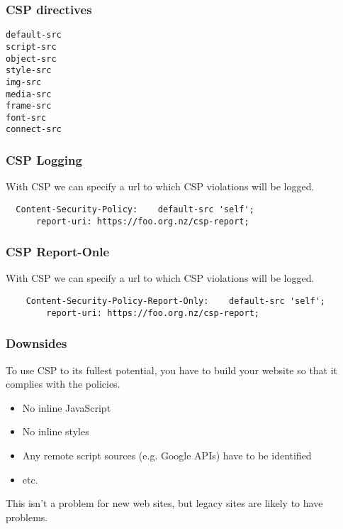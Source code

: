 \documentclass[10pt]{beamer}
\begin{document}
\begin{frame}[fragile]
\frametitle{CSP directives}

\begin{verbatim}
default-src
script-src
object-src
style-src
img-src
media-src
frame-src
font-src
connect-src
\end{verbatim}




\end{frame}

\begin{frame}[fragile]
\frametitle{CSP Logging}

With CSP we can specify a url to which CSP violations will be logged. 

\begin{verbatim}
  Content-Security-Policy:    default-src 'self'; 
      report-uri: https://foo.org.nz/csp-report;
\end{verbatim}


\end{frame}

\begin{frame}[fragile]
	\frametitle{CSP Report-Onle}
	
	With CSP we can specify a url to which CSP violations will be logged. 
	
	\begin{verbatim}
	Content-Security-Policy-Report-Only:    default-src 'self'; 
	    report-uri: https://foo.org.nz/csp-report;
	\end{verbatim}
	
	
\end{frame}

\begin{frame}[fragile]
	\frametitle{Downsides}
	
	To use CSP to its fullest potential, you have to build your website
	so that it complies with the policies.
	
	\begin{itemize}
		\item No inline JavaScript
		\item No inline styles
		\item Any remote script sources (e.g. Google APIs) have to be identified
		\item etc.
	\end{itemize}
		
	This isn't a problem for new web sites, but legacy sites are likely to have problems.
\end{frame}
\end{document}
